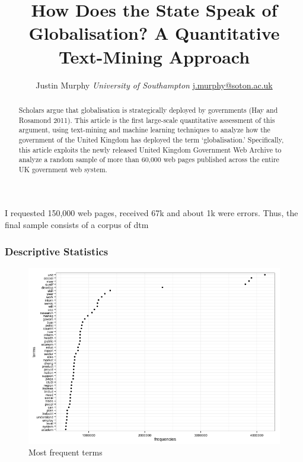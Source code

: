 \documentclass[11pt,article,oneside]{memoir}
\title{\bigskip \bigskip How Does the State Speak of Globalisation? A Quantitative Text-Mining
Approach}
\author{\Large Justin Murphy\vspace{0.05in} \newline\normalsize\emph{University of Southampton} \newline\footnotesize \url{j.murphy@soton.ac.uk}\vspace*{0.2in}\newline }
\date{}
\makeatletter
\def\maxwidth{\ifdim\Gin@nat@width>\linewidth\linewidth
\else\Gin@nat@width\fi}
\let\Oldincludegraphics\includegraphics
\renewcommand{\includegraphics}[1]{\Oldincludegraphics[width=\maxwidth]{#1}}
\makeatother
\begin{document}
  
\setsansfont[Mapping=tex-text]{Gill Sans} 
\setmonofont[Mapping=tex-text,Scale=0.8]{Consolas}

\doublespacing


\maketitle



\begin{abstract}

\noindent Scholars argue that globalisation is strategically deployed by
governments (Hay and Rosamond 2011). This article is the first
large-scale quantitative assessment of this argument, using text-mining
and machine learning techniques to analyze how the government of the
United Kingdom has deployed the term `globalisation.' Specifically, this
article exploits the newly released United Kingdom Government Web
Archive to analyze a random sample of more than 60,000 web pages
published across the entire UK government web system.

\end{abstract}


I requested 150,000 web pages, received 67k and about 1k were errors.
Thus, the final sample consists of a corpus of dtm

\pagebreak

\subsubsection{Descriptive Statistics}\label{descriptive-statistics}

\begin{figure}[htbp]
\centering
\includegraphics{figure/globalisation_frequency_plot.png}
\caption{Most frequent terms}
\end{figure}
\end{document}
